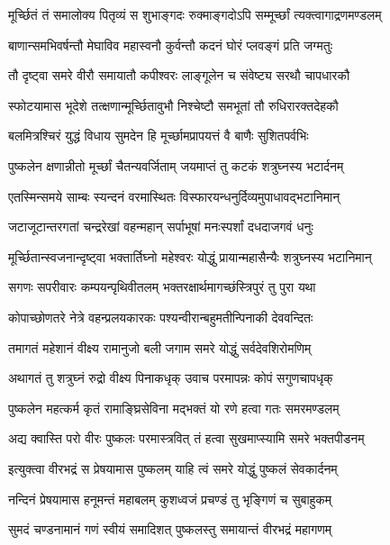 \twolineshloka
{मूर्च्छितं तं समालोक्य पितृव्यं स शुभाङ्गदः}
{रुक्माङ्गदोऽपि सम्मूर्च्छां त्यक्त्वागाद्रणमण्डलम्}%

\twolineshloka
{बाणान्समभिवर्षन्तौ मेघाविव महास्वनौ}
{कुर्वन्तौ कदनं घोरं प्लवङ्गं प्रति जग्मतुः}%

\twolineshloka
{तौ दृष्ट्वा समरे वीरौ समायातौ कपीश्वरः}
{लाङ्गूलेन च संवेष्ट्य सरथौ चापधारकौ}%

\twolineshloka
{स्फोटयामास भूदेशे तत्क्षणान्मूर्च्छितावुभौ}
{निश्चेष्टौ समभूतां तौ रुधिरारक्तदेहकौ}%

\twolineshloka
{बलमित्रश्चिरं युद्धं विधाय सुमदेन हि}
{मूर्च्छामप्रापयत्तं वै बाणैः सुशितपर्वभिः}%

\twolineshloka
{पुष्कलेन क्षणान्नीतो मूर्च्छां चैतन्यवर्जिताम्}
{जयमाप्तं तु कटकं शत्रुघ्नस्य भटार्दनम्}%

\twolineshloka
{एतस्मिन्समये साम्बः स्यन्दनं वरमास्थितः}
{विस्फारयन्धनुर्दिव्यमुपाधावद्भटानिमान्}%

\twolineshloka
{जटाजूटान्तरगतां चन्द्ररेखां वहन्महान्}
{सर्पाभूषां मनःस्पर्शां दधदाजगवं धनुः}%

\twolineshloka
{मूर्च्छितान्स्वजनान्दृष्ट्वा भक्तार्तिघ्नो महेश्वरः}
{योद्धुं प्रायान्महासैन्यैः शत्रुघ्नस्य भटानिमान्}%

\twolineshloka
{सगणः सपरीवारः कम्पयन्पृथिवीतलम्}
{भक्तरक्षार्थमागच्छंस्त्रिपुरं तु पुरा यथा}%

\twolineshloka
{कोपाच्छोणतरे नेत्रे वहन्प्रलयकारकः}
{पश्यन्वीरान्बहुमतीन्पिनाकी देववन्दितः}%

\twolineshloka
{तमागतं महेशानं वीक्ष्य रामानुजो बली}
{जगाम समरे योद्धुं सर्वदेवशिरोमणिम्}%

\twolineshloka
{अथागतं तु शत्रुघ्नं रुद्रो वीक्ष्य पिनाकधृक्}
{उवाच परमापन्नः कोपं सगुणचापधृक्}%

\twolineshloka
{पुष्कलेन महत्कर्म कृतं रामाङ्घ्रिसेविना}
{मद्भक्तं यो रणे हत्वा गतः समरमण्डलम्}%

\twolineshloka
{अद्य क्वास्ति परो वीरः पुष्कलः परमास्त्रवित्}
{तं हत्वा सुखमाप्स्यामि समरे भक्तपीडनम्}%


\twolineshloka
{इत्युक्त्वा वीरभद्रं स प्रेषयामास पुष्कलम्}
{याहि त्वं समरे योद्धुं पुष्कलं सेवकार्दनम्}%

\twolineshloka
{नन्दिनं प्रेषयामास हनूमन्तं महाबलम्}
{कुशध्वजं प्रचण्डं तु भृङ्गिणं च सुबाहुकम्}%

\twolineshloka
{सुमदं चण्डनामानं गणं स्वीयं समादिशत्}
{पुष्कलस्तु समायान्तं वीरभद्रं महागणम्}%

